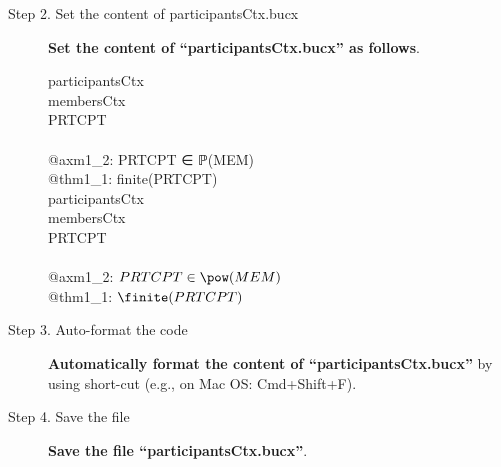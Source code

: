 \begin{description}
\item[Step 2. Set the content of participantsCtx.bucx] \textbf{Set the content of ``participantsCtx.bucx'' as follows}.
  \begin{center}
    \begin{Bcode}
      \ifplastex
      \Bcontext{} participantsCtx\\
      \Bextends{} membersCtx\\
      \Bconstants{} PRTCPT\\
      \Baxioms\\
      @axm1_2: PRTCPT ∈ ℙ(MEM)\\
      \Btheorem{} @thm1_1: finite(PRTCPT)\\
      \Bend
      \else
      \Bcontext{} participantsCtx\\
      \Bextends{} membersCtx\\
      \Bconstants{} PRTCPT\\
      \Baxioms\\
      \Btab @axm1_2: \(PRTCPT \in \pow(MEM)\)\\
      \Btab \Btheorem{} @thm1_1: \(\finite(PRTCPT)\)\\
      \Bend
      \fi
    \end{Bcode}
  \end{center}

\item[Step 3. Auto-format the code] \textbf{Automatically format the content of ``participantsCtx.bucx''} by using short-cut (e.g., on Mac OS: Cmd+Shift+F).

\item[Step 4. Save the file] \textbf{Save the file ``participantsCtx.bucx''}.
\end{description}


